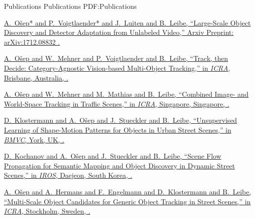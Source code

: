 \documentclass[letterpaper,MMMyyyy,nonstopmode]{simpleresumecv}
\begin{document}
\begin{Body}

\Section
{Publications}
{Publications}
{PDF:Publications}

%
%
%
\begingroup

\Gap
\href{https://arxiv.org/abs/1712.08832}
{\underline{A.~O\v{s}ep}* and P.~Voigtlaender* and J.~Luiten and B.~Leibe,
``Large-Scale Object Discovery and Detector Adaptation from Unlabeled Video,''
Arxiv Preprint:	arXiv:1712.08832 
.}

\Gap
\href{https://arxiv.org/pdf/1712.07920.pdf}
{\underline{A.~Ošep} and W.~Mehner and P.~Voigtlaender and B.~Leibe,
``Track, then Decide: Category-Agnostic Vision-based Multi-Object Tracking,''
in \textit{ICRA},
Brisbane, Australia,
.}

\Gap
\href{https://www.vision.rwth-aachen.de/media/papers/paper_final_compressed.pdf}
{\underline{A.~Ošep} and W.~Mehner and M.~Mathias and B.~Leibe,
``Combined Image- and World-Space Tracking in Traffic Scenes,''
in \textit{ICRA},
Singapore, Singapore,
.}

\Gap
\href{https://www.vision.rwth-aachen.de/media/papers/bmvc16_klostermann_final.pdf}
{D.~Klostermann and \underline{A.~Ošep} and J.~Stueckler and B.~Leibe,
``Unsupervised Learning of Shape-Motion Patterns for Objects in Urban Street Scenes,''
in \textit{BMVC},
York, UK,
.}

\Gap
\href{https://www.vision.rwth-aachen.de/media/papers/paper_compressed.pdf}
{D.~Kochanov and \underline{A.~Ošep} and J.~Stueckler and B.~Leibe,
``Scene Flow Propagation for Semantic Mapping and Object Discovery in Dynamic Street Scenes,''
in \textit{IROS},
Daejeon, South Korea,
.}

\Gap
\href{https://www.vision.rwth-aachen.de/media/papers/osep_ICRA16_paper.pdf}
{\underline{A.~Ošep} and A.~Hermans and F.~Engelmann and D.~Klostermann and B.~Leibe,
``Multi-Scale Object Candidates for Generic Object Tracking in Street Scenes,''
in \textit{ICRA}, Stockholm, Sweden,
.}


\end{Body}
\end{document}
